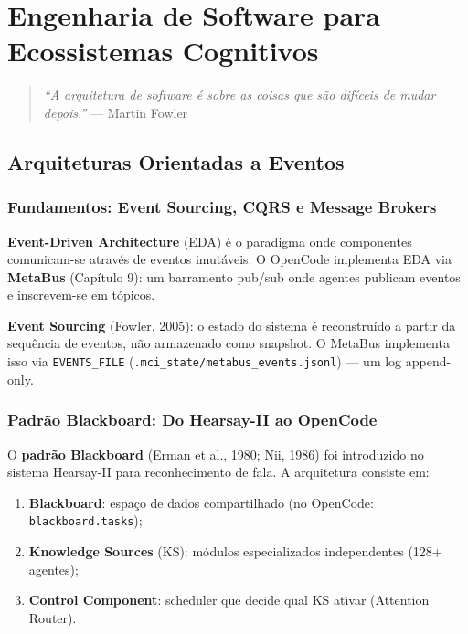 \chapter{Engenharia de Software para Ecossistemas Cognitivos}

\begin{quote}
\textit{``A arquitetura de software é sobre as coisas que são difíceis de mudar depois.''} --- Martin Fowler
\end{quote}

\section{Arquiteturas Orientadas a Eventos}

\subsection{Fundamentos: Event Sourcing, CQRS e Message Brokers}

\textbf{Event-Driven Architecture} (EDA) é o paradigma onde componentes comunicam-se através de eventos imutáveis. O OpenCode implementa EDA via \textbf{MetaBus} (Capítulo 9): um barramento pub/sub onde agentes publicam eventos e inscrevem-se em tópicos.

\textbf{Event Sourcing} (Fowler, 2005): o estado do sistema é reconstruído a partir da sequência de eventos, não armazenado como snapshot. O MetaBus implementa isso via \texttt{EVENTS\_FILE} (\texttt{.mci\_state/metabus\_events.jsonl}) — um log append-only.

\subsection{Padrão Blackboard: Do Hearsay-II ao OpenCode}

O \textbf{padrão Blackboard} (Erman et al., 1980; Nii, 1986) \cite{erman1980hearsay} foi introduzido no sistema Hearsay-II para reconhecimento de fala. A arquitetura consiste em:

\begin{enumerate}
    \item \textbf{Blackboard}: espaço de dados compartilhado (no OpenCode: \texttt{blackboard.tasks});
    \item \textbf{Knowledge Sources} (KS): módulos especializados independentes (128+ agentes);
    \item \textbf{Control Component}: scheduler que decide qual KS ativar (Attention Router).
\end{enumerate}

